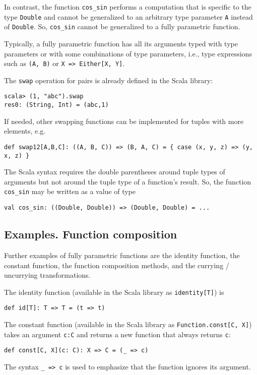 In contrast, the function \lstinline!cos_sin! performs a computation
that is specific to the type \lstinline!Double! and cannot be generalized
to an arbitrary type parameter \lstinline!A! instead of \lstinline!Double!.
So, \lstinline!cos_sin! cannot be generalized to a fully parametric
function.

Typically, a fully parametric function has all its arguments typed
with type parameters or with some combinations of type parameters,
i.e., type expressions such as \lstinline!(A, B)! or \lstinline!X => Either[X, Y]!.

The \lstinline!swap! operation for pairs is already defined in the
Scala library:
\begin{lstlisting}
scala> (1, "abc").swap
res0: (String, Int) = (abc,1)
\end{lstlisting}
If needed, other swapping functions can be implemented for tuples
with more elements, e.g.
\begin{lstlisting}
def swap12[A,B,C]: ((A, B, C)) => (B, A, C) = { case (x, y, z) => (y, x, z) }
\end{lstlisting}
The Scala syntax requires the double parentheses around tuple types
of arguments but not around the tuple type of a function\textsf{'}s result.
So, the function \lstinline!cos_sin! may be written as a value of
type
\begin{lstlisting}
val cos_sin: ((Double, Double)) => (Double, Double) = ...
\end{lstlisting}


\subsection{Examples. Function composition\label{subsec:Examples-of-fully-parametric}}

Further examples of fully parametric functions are the identity function,
the constant function, the function composition methods, and the currying
/ uncurrying transformations. 

The identity function (available in the
Scala library as \lstinline!identity[T]!) is
\begin{lstlisting}
def id[T]: T => T = (t => t)
\end{lstlisting}
The constant function (available in the
Scala library as \lstinline!Function.const[C, X]!) takes an argument
\lstinline!c:C! and returns a new function that always returns \lstinline!c!:
\begin{lstlisting}
def const[C, X](c: C): X => C = (_ => c)
\end{lstlisting}
The syntax \lstinline!_ => c! is used to emphasize that the function
ignores its argument.

